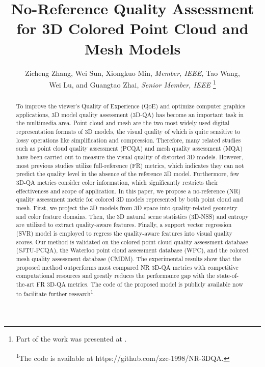 \documentclass[lettersize,journal]{IEEEtran}
\begin{document}
\title{No-Reference Quality Assessment for 3D Colored Point Cloud and Mesh Models}

\author{Zicheng Zhang, Wei Sun, Xiongkuo Min, \emph{Member, IEEE,} Tao Wang, \\ Wei Lu, and Guangtao Zhai, \emph{Senior Member, IEEE} 
\thanks{
Part of the work was presented at \cite{zhang2021}. 

\textsuperscript{1}The code is available at https://github.com/zzc-1998/NR-3DQA.}\\}





\maketitle
\thispagestyle{plain}
\pagestyle{plain}
\begin{abstract}
To improve the viewer's Quality of Experience (QoE) and optimize computer graphics applications, 3D model quality assessment (3D-QA) has become an important task in the multimedia area. Point cloud and mesh are the two most widely used digital representation formats of 3D models, the visual quality of which is quite sensitive to lossy operations like simplification and compression. Therefore, many related studies such as point cloud quality assessment (PCQA) and mesh quality assessment (MQA) have been carried out to measure the visual quality of distorted 3D models. However, most previous studies utilize full-reference (FR) metrics, which indicates they can not predict the quality level in the absence of the reference 3D model. Furthermore, few 3D-QA metrics consider color information, which significantly restricts their effectiveness and scope of application. In this paper, we propose a no-reference (NR) quality assessment metric for colored 3D models represented by both point cloud and mesh. First, we project the 3D models from 3D space into quality-related geometry and color feature domains. Then, the 3D natural scene statistics (3D-NSS) and entropy are utilized to extract quality-aware features. Finally, a support vector regression (SVR) model is employed to regress the quality-aware features into visual quality scores. Our method is validated on the colored point cloud quality assessment database (SJTU-PCQA), the Waterloo point cloud assessment database (WPC), and the colored mesh quality assessment database (CMDM). The experimental results show that the proposed method outperforms most compared NR 3D-QA metrics with competitive computational resources and greatly reduces the performance gap with the state-of-the-art FR 3D-QA metrics. The code of the proposed model is publicly available now to facilitate further research\textsuperscript{1}.  
\end{abstract}
\end{document}
